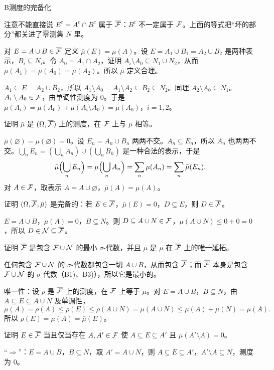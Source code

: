 \begin{probleme}{B}{测度的完备化}
\begin{questions}
\begin{solution}
注意不能直接说 $E^c=A^c\cap B^c$ 属于 $\overline{\mathcal{F}}$：$B^c$ 不一定属于 $\mathcal{F}$。上面的等式把“坏的部分”都关进了零测集 $N$ 里。
\end{solution}
\item 对 $E=A\cup B\in\overline{\mathcal{F}}$ 定义 $\bar\mu(E)=\mu(A)$。设 $E=A_1\cup B_1=A_2\cup B_2$ 是两种表示，$B_i\subseteq N_i$。令 $A_0=A_1\cap A_2$，证明 $A_i\setminus A_0\subseteq N_1\cup N_2$，从而 $\mu(A_1)=\mu(A_0)=\mu(A_2)$。所以 $\bar\mu$ 定义合理。
\begin{solution}
$A_1\subseteq E=A_2\cup B_2$，所以 $A_1\setminus A_0=A_1\setminus A_2\subseteq B_2\subseteq N_2$。同理 $A_2\setminus A_0\subseteq N_1$。$A_i\setminus A_0\in\mathcal{F}$，由单调性测度为 $0$。于是 $\mu(A_i)=\mu(A_0)+\mu(A_i\setminus A_0)=\mu(A_0)$，$i=1,2$。
\end{solution}
\item 证明 $\bar\mu$ 是 $(\Omega,\overline{\mathcal{F}})$ 上的测度，在 $\mathcal{F}$ 上与 $\mu$ 相等。
\begin{solution}
$\bar\mu(\varnothing)=\mu(\varnothing)=0$。设 $E_n=A_n\cup B_n$ 两两不交。$A_n\subseteq E_n$，所以 $A_n$ 也两两不交。$\bigcup_nE_n=(\bigcup_nA_n)\cup(\bigcup_nB_n)$ 是一种合法的表示，于是
\[
\bar\mu\Bigl(\bigcup_nE_n\Bigr)=\mu\Bigl(\bigcup_nA_n\Bigr)=\sum_n\mu(A_n)=\sum_n\bar\mu(E_n).
\]
对 $A\in\mathcal{F}$，取表示 $A=A\cup\varnothing$，$\bar\mu(A)=\mu(A)$。
\end{solution}
\item 证明 $(\Omega,\overline{\mathcal{F}},\bar\mu)$ 是完备的：若 $E\in\overline{\mathcal{F}}$，$\bar\mu(E)=0$，$D\subseteq E$，则 $D\in\overline{\mathcal{F}}$。
\begin{solution}
$E=A\cup B$，$\mu(A)=0$，$B\subseteq N$。则 $D\subseteq A\cup N\in\mathcal{F}$，$\mu(A\cup N)\leqslant0+0=0$，所以 $D\in\mathcal{N}\subseteq\overline{\mathcal{F}}$。
\end{solution}
\item 证明 $\overline{\mathcal{F}}$ 是包含 $\mathcal{F}\cup\mathcal{N}$ 的最小 $\sigma$-代数，并且 $\bar\mu$ 是 $\mu$ 在 $\overline{\mathcal{F}}$ 上的唯一延拓。
\begin{solution}
任何包含 $\mathcal{F}\cup\mathcal{N}$ 的 $\sigma$-代数都包含一切 $A\cup B$，从而包含 $\overline{\mathcal{F}}$；而 $\overline{\mathcal{F}}$ 本身是包含 $\mathcal{F}\cup\mathcal{N}$ 的 $\sigma$-代数（B1)、B3)），所以它是最小的。

唯一性：设 $\rho$ 是 $\overline{\mathcal{F}}$ 上的测度，在 $\mathcal{F}$ 上等于 $\mu$。对 $E=A\cup B$，$B\subseteq N$，由 $A\subseteq E\subseteq A\cup N$ 及单调性，
\[
\mu(A)=\rho(A)\leqslant\rho(E)\leqslant\rho(A\cup N)=\mu(A\cup N)\leqslant\mu(A)+\mu(N)=\mu(A).
\]
所以 $\rho(E)=\mu(A)=\bar\mu(E)$。
\end{solution}
\item 证明 $E\in\overline{\mathcal{F}}$ 当且仅当存在 $A,A'\in\mathcal{F}$ 使 $A\subseteq E\subseteq A'$ 且 $\mu(A'\setminus A)=0$。
\begin{solution}
“$\Rightarrow$”：$E=A\cup B$，$B\subseteq N$，取 $A'=A\cup N$，则 $A\subseteq E\subseteq A'$，$A'\setminus A\subseteq N$，测度为 $0$。


\end{solution}
\end{questions}
\end{probleme}

